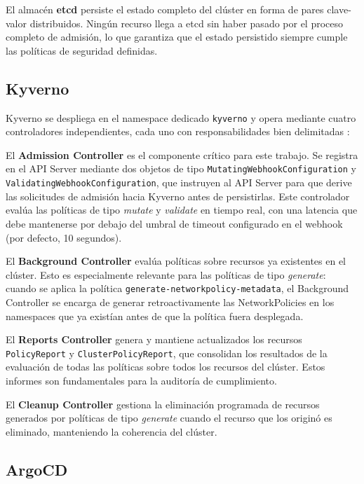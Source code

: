 El almacén \textbf{etcd} persiste el estado completo del clúster en forma de pares clave-valor distribuidos. Ningún recurso llega a etcd sin haber pasado por el proceso completo de admisión, lo que garantiza que el estado persistido siempre cumple las políticas de seguridad definidas.

\subsection{Kyverno}

Kyverno se despliega en el namespace dedicado \texttt{kyverno} y opera mediante cuatro controladores independientes, cada uno con responsabilidades bien delimitadas \cite{kyverno_docs}:

El \textbf{Admission Controller} es el componente crítico para este trabajo. Se registra en el API Server mediante dos objetos de tipo \texttt{Mutating\-Webhook\-Configuration} y \texttt{Validating\-Webhook\-Configuration}, que instruyen al API Server para que derive las solicitudes de admisión hacia Kyverno antes de persistirlas. Este controlador evalúa las políticas de tipo \textit{mutate} y \textit{validate} en tiempo real, con una latencia que debe mantenerse por debajo del umbral de timeout configurado en el webhook (por defecto, 10 segundos).

El \textbf{Background Controller} evalúa políticas sobre recursos ya existentes en el clúster. Esto es especialmente relevante para las políticas de tipo \textit{generate}: cuando se aplica la política \texttt{generate-networkpolicy-metadata}, el Background Controller se encarga de generar retroactivamente las NetworkPolicies en los namespaces que ya existían antes de que la política fuera desplegada.

El \textbf{Reports Controller} genera y mantiene actualizados los recursos \texttt{PolicyReport} y \texttt{ClusterPolicyReport}, que consolidan los resultados de la evaluación de todas las políticas sobre todos los recursos del clúster. Estos informes son fundamentales para la auditoría de cumplimiento.

El \textbf{Cleanup Controller} gestiona la eliminación programada de recursos generados por políticas de tipo \textit{generate} cuando el recurso que los originó es eliminado, manteniendo la coherencia del clúster.

\subsection{ArgoCD}

